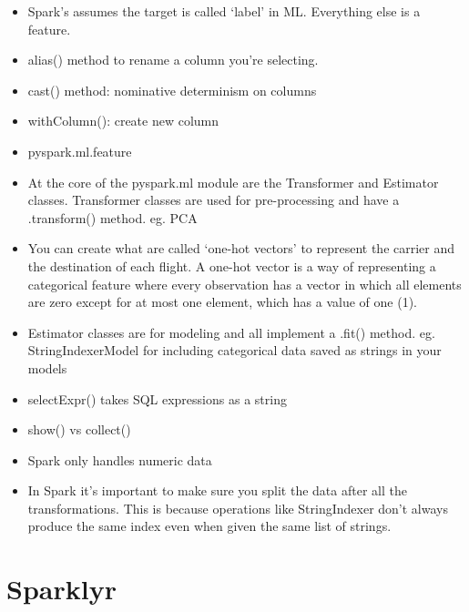 \documentclass[]{book}
\theoremstyle{definition}
\theoremstyle{definition}
\theoremstyle{definition}
\theoremstyle{remark}
\begin{document}
\begin{itemize}
\item
  Spark's assumes the target is called `label' in ML. Everything else is
  a feature.
\item
  alias() method to rename a column you're selecting.
\item
  cast() method: nominative determinism on columns
\item
  withColumn(): create new column
\item
  pyspark.ml.feature
\item
  At the core of the pyspark.ml module are the Transformer and Estimator
  classes. Transformer classes are used for pre-processing and have a
  .transform() method. eg. PCA
\item
  You can create what are called `one-hot vectors' to represent the
  carrier and the destination of each flight. A one-hot vector is a way
  of representing a categorical feature where every observation has a
  vector in which all elements are zero except for at most one element,
  which has a value of one (1).
\item
  Estimator classes are for modeling and all implement a .fit() method.
  eg. StringIndexerModel for including categorical data saved as strings
  in your models
\item
  selectExpr() takes SQL expressions as a string
\item
  show() vs collect()
\item
  Spark only handles numeric data
\item
  In Spark it's important to make sure you split the data after all the
  transformations. This is because operations like StringIndexer don't
  always produce the same index even when given the same list of
  strings.
\end{itemize}

\section{Sparklyr}\label{sparklyr}
\end{document}
